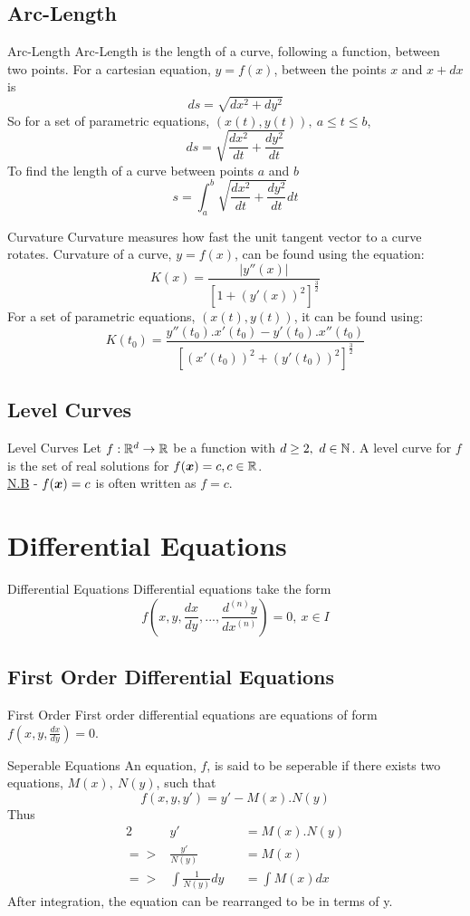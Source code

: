\documentclass[11pt,a4paper]{article}
\begin{document}
\subsection{Arc-Length}
%
\subtitle{Theorem 5.03 - }{Arc-Length}
Arc-Length is the length of a curve, following a function, between two points. For a cartesian equation, $y = f(x)$, between the points $x$ and $x + dx$ is $$ds = \sqrt{dx^2 + dy^2}$$
So for a set of parametric equations, $(x(t), y(t)),\ a \leq t \leq b$, $$ds = \sqrt{\frac{dx^2}{dt} + \frac{dy^2}{dt}}$$
To find the length of a curve between points $a$ and $b$ $$s = \int_{a}^{b} \sqrt{\frac{dx^2}{dt} + \frac{dy^2}{dt}} dt$$

\subtitle{Definition 5.04 - }{Curvature}
Curvature measures how fast the unit tangent vector to a curve rotates.
Curvature of a curve, $y = f(x)$, can be found using the equation: $$K(x) = \frac{|y''(x)|}{[1 + (y'(x))^2]^{\frac{3}{2}}}$$
For a set of parametric equations, $(x(t), y(t))$, it can be found using: $$K(t_0) = \frac{y''(t_0).x'(t_0) - y'(t_0).x''(t_0)}{[(x'(t_0))^2 + (y'(t_0))^2]^{\frac{3}{2}}}$$

\subsection{Level Curves}
%
\subtitle{Definition 5.05 - }{Level Curves}
Let $f : \mathbb{R}^d \to \mathbb{R}$ be a function with $d \geq 2,\ d \in \mathbb{N}$. A level curve for $f$ is the set of real solutions for $f(\boldsymbol{x}) = c, c \in \mathbb{R}$. \\
\underline{N.B} - $f(\boldsymbol{x}) = c$ is often written as $f = c$.

\section{Differential Equations}
%
\subtitle{Definition 6.01 - }{Differential Equations}
Differential equations take the form $$f(x, y, \frac{dx}{dy}, ... , \frac{d^{(n)}y}{dx^{(n)}}) = 0,\ x \in I$$

\subsection{First Order Differential Equations}
%
\subtitle{Definition 6.02 - }{First Order}
First order differential equations are equations of form $f(x, y, \frac{dx}{dy}) = 0$. \\

\subtitle{Definition 6.03 - }{Seperable Equations}
An equation, $f$, is said to be seperable if there exists two equations, $M(x),\ N(y)$, such that $$f(x, y, y') = y' - M(x).N(y)$$
Thus \begin{alignat*}{2}
  &y' &&= M(x).N(y) \\
  => &\frac{y'}{N(y)} &&= M(x) \\
  => &\int{\frac{1}{N(y)}dy} &&= \int{M(x)dx}
\end{alignat*}
After integration, the equation can be rearranged to be in terms of y.
\end{document}
